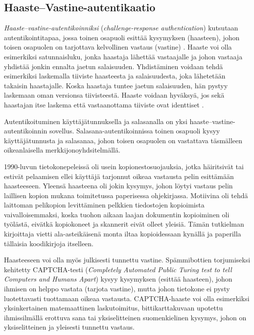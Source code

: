 \documentclass[finnish,gradu]{tktltiki}
\begin{document}
  \subsection{Haaste--Vastine-autentikaatio} %
  \label{sub:haaste_vastine_autentikaatio}

  \emph{Haaste--vastine-autentikoinniksi} (\emph{challenge-response authentication}) kutsutaan autentikointitapaa, jossa toinen osapuoli esittää kysymyksen (haasteen), johon toisen osapuolen on tarjottava kelvollinen vastaus (vastine) \cite{NIST_SP800-63-1}. Haaste voi olla esimerkiksi satunnaisluku, jonka haastaja lähettää vastaajalle ja johon vastaaja yhdistää jonkin ennalta jaetun salaisuuden. Yhdistäminen voidaan tehdä esimerkiksi laskemalla tiiviste haasteesta ja salaisuudesta, joka lähetetään takaisin haastajalle. Koska haastaja tuntee jaetun salaisuuden, hän pystyy laskemaan oman versionsa tiivisteestä. Haaste voidaan hyväksyä, jos sekä haastajan itse laskema että vastaanottama tiiviste ovat identtiset \cite{NIST_SP800-63-1}.

  Autentikoituminen käyttäjätunnuksella ja salasanalla on yksi haaste--vastine-autentikoinnin sovellus. Salasana-autentikoinnissa toinen osapuoli kysyy käyttäjätunnusta ja salasanaa, johon toisen osapuolen on vastattava täsmälleen oikeanlaisella merkkijonoyhdsitelmällä.

  1990-luvun tietokonepeleissä oli usein kopionestosuojauksia, jotka häiritsivät tai estivät pelaamisen ellei käyttäjä tarjonnut oikeaa vastausta pelin esittämään haasteeseen. Yleensä haasteena oli jokin kysymys, johon löytyi vastaus pelin laillisen kopion mukana toimitetussa paperisessa ohjekirjassa. Motiivina oli tehdä laittoman pelikopion levittäminen pelkkien tiedostojen kopioimista vaivalloisemmaksi, koska tuohon aikaan laajan dokumentin kopioiminen oli työlästä, eivätkä kopiokoneet ja skannerit eivät olleet yleisiä. Tämän tutkielman kirjoittaja vietti ala-asteikäisenä monta iltaa kopioidessaan kynällä ja paperilla tällaisia koodikirjoja itselleen.

  Haasteeseen voi olla myös julkisesti tunnettu vastine. Spämmibottien torjumiseksi kehitetty CAPTCHA-testi (\emph{Completely Automated Public Turing test to tell Computers and Humans Apart}) kysyy kysymyksen (esittää haasteen), johon ihmisen on helppo vastata (tarjota vastine), mutta johon tietokone ei pysty luotettavasti tuottamaan oikeaa vastausta. CAPTCHA-haaste voi olla esimerkiksi yksinkertainen matemaattinen laskutoimitus, bittikarttakuvaan upotettu ihmissilmällä erottuva sana tai yksiselitteinen suomenkielinen kysymys, johon on yksiselitteinen ja yleisesti tunnettu vastaus.
\end{document}
